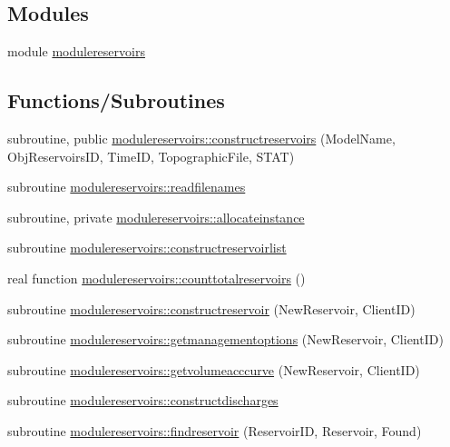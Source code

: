 \subsection*{Modules}
\begin{DoxyCompactItemize}
\item 
module \mbox{\hyperlink{namespacemodulereservoirs}{modulereservoirs}}
\end{DoxyCompactItemize}
\subsection*{Functions/\+Subroutines}
\begin{DoxyCompactItemize}
\item 
subroutine, public \mbox{\hyperlink{namespacemodulereservoirs_a8356f95662b41d91816350cf3f3c6113}{modulereservoirs\+::constructreservoirs}} (Model\+Name, Obj\+Reservoirs\+ID, Time\+ID, Topographic\+File, S\+T\+AT)
\item 
subroutine \mbox{\hyperlink{namespacemodulereservoirs_a9ca6b6f1b29d44a299bd0cd902b875bd}{modulereservoirs\+::readfilenames}}
\item 
subroutine, private \mbox{\hyperlink{namespacemodulereservoirs_a3bbdfd18a9b8de49cb39c9c2e60824f5}{modulereservoirs\+::allocateinstance}}
\item 
subroutine \mbox{\hyperlink{namespacemodulereservoirs_ac7bcb5beebaa4c557e558719e9656911}{modulereservoirs\+::constructreservoirlist}}
\item 
real function \mbox{\hyperlink{namespacemodulereservoirs_ac5bf14d3b0efa223e5c19855bb2380f2}{modulereservoirs\+::counttotalreservoirs}} ()
\item 
subroutine \mbox{\hyperlink{namespacemodulereservoirs_adb0f83f2d398504e99ff31c83a07ff2b}{modulereservoirs\+::constructreservoir}} (New\+Reservoir, Client\+ID)
\item 
subroutine \mbox{\hyperlink{namespacemodulereservoirs_aa1e3cf305f3f33775d706fde19afd2c6}{modulereservoirs\+::getmanagementoptions}} (New\+Reservoir, Client\+ID)
\item 
subroutine \mbox{\hyperlink{namespacemodulereservoirs_af78ebbee661caa48931d2c60385bda27}{modulereservoirs\+::getvolumeacccurve}} (New\+Reservoir, Client\+ID)
\item 
subroutine \mbox{\hyperlink{namespacemodulereservoirs_a720deae8cfb3dc32643ce6afdfa4d187}{modulereservoirs\+::constructdischarges}}
\item 
subroutine \mbox{\hyperlink{namespacemodulereservoirs_aaff88903c37ba70d4b309e252229107b}{modulereservoirs\+::findreservoir}} (Reservoir\+ID, Reservoir, Found)

\end{DoxyCompactItemize}
